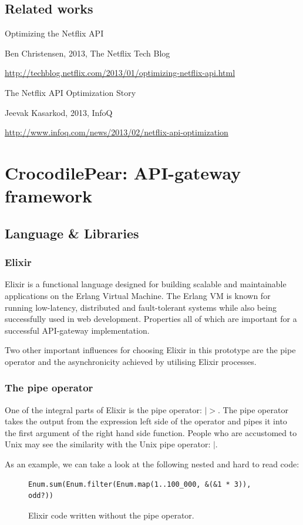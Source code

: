\documentclass{cslthse-msc}
\begin{document}
\section{Related works}
Optimizing the Netflix API

Ben Christensen, 2013, The Netflix Tech Blog

\url{http://techblog.netflix.com/2013/01/optimizing-netflix-api.html}

The Netflix API Optimization Story

Jeevak Kasarkod, 2013, InfoQ

\url{http://www.infoq.com/news/2013/02/netflix-api-optimization}

\chapter{CrocodilePear: API-gateway framework}

\section{Language \& Libraries}
\subsection{Elixir}
Elixir is a functional language designed for building scalable and maintainable applications on the Erlang Virtual Machine. The Erlang VM is known for running low-latency, distributed and fault-tolerant systems while also being successfully used in web development\cite{elixir}. Properties all of which are important for a successful API-gateway implementation.

Two other important influences for choosing Elixir in this prototype are the pipe operator and the asynchronicity achieved by utilising Elixir processes.

\subsection{The pipe operator}
One of the integral parts of Elixir is the pipe operator: $|>$. The pipe operator takes the output from the expression left side of the operator and pipes it into the first argument of the right hand side function. People who are accustomed to Unix may see the similarity with the Unix pipe operator: $|$.

As an example, we can take a look at the following nested and hard to read code:

\begin{figure}[H]
  \centering
\begin{lstlisting}[breaklines=true,frame=single]
Enum.sum(Enum.filter(Enum.map(1..100_000, &(&1 * 3)), odd?))
\end{lstlisting}
  \caption{Elixir code written without the pipe operator.}
\end{figure}
\end{document}
